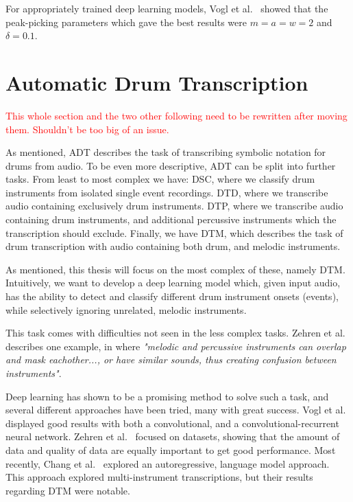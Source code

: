 For appropriately trained deep learning models, Vogl et al.~\cite{vogl2018multiinstrumentdrumtranscription} showed that the peak-picking parameters which gave the best results were $m = a = w = 2$ and $\delta = 0.1$.


\section{Automatic Drum Transcription}

\textcolor{red}{This whole section and the two other following need to be rewritten after moving them. Shouldn't be too big of an issue.}

As mentioned, \gls{ADT} describes the task of transcribing symbolic notation for drums from audio. To be even more descriptive, \gls{ADT} can be split into further tasks. From least to most complex we have: \gls{DSC}, where we classify drum instruments from isolated single event recordings. \gls{DTD}, where we transcribe audio containing exclusively drum instruments. \gls{DTP}, where we transcribe audio containing drum instruments, and additional percussive instruments which the transcription should exclude. Finally, we have \gls{DTM}, which describes the task of drum transcription with audio containing both drum, and melodic instruments.~\cite{8350302}

As mentioned, this thesis will focus on the most complex of these, namely \gls{DTM}. Intuitively, we want to develop a deep learning model which, given input audio, has the ability to detect and classify different drum instrument onsets (events), while selectively ignoring unrelated, melodic instruments.

This task comes with difficulties not seen in the less complex tasks. Zehren et al.~\cite{signals4040042} describes one example, in where \textit{"melodic and percussive instruments can overlap and mask eachother..., or have similar sounds, thus creating confusion between instruments"}.

Deep learning has shown to be a promising method to solve such a task, and several different approaches have been tried, many with great success. Vogl et al.~\cite{vogl2018multiinstrumentdrumtranscription, Vogl2017DrumTV} displayed good results with both a convolutional, and a convolutional-recurrent neural network. Zehren et al.~\cite{signals4040042, zehren2024analyzingreducingsynthetictorealtransfer} focused on datasets, showing that the amount of data and quality of data are equally important to get good performance. Most recently, Chang et al.~\cite{chang2024yourmt3+} explored an autoregressive, language model approach. This approach explored multi-instrument transcriptions, but their results regarding \gls{DTM} were notable.

